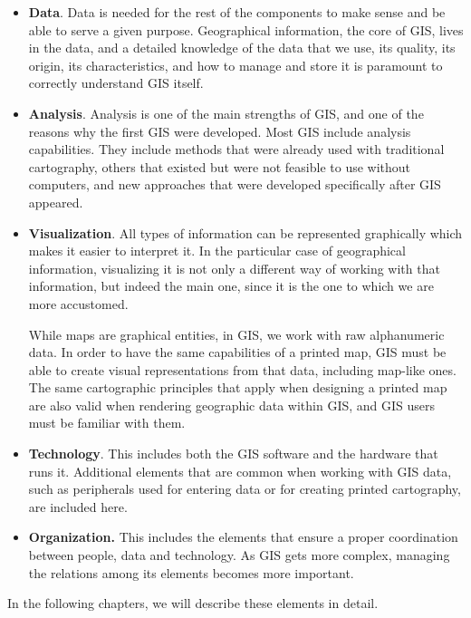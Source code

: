 \begin{itemize}
\item \textbf{Data}. Data is needed for the rest of the components to make sense and be able to serve a given purpose. Geographical information, the core of GIS, lives in the data, and a detailed knowledge of the data that we use, its quality, its origin, its characteristics, and how to manage and store it is paramount to correctly understand GIS itself.
\item \textbf{Analysis}. Analysis is one of the main strengths of GIS, and one of the reasons why the first GIS were developed. Most GIS include analysis capabilities. They include methods that were already used with traditional cartography, others that existed but were not feasible to use without computers, and new approaches that were developed specifically after GIS appeared.
\item \textbf{Visualization}. All types of information can be represented graphically which makes it easier to interpret it. In the particular case of geographical information, visualizing it is not only a different way of working with that information, but indeed the main one, since it is the one to which we are more accustomed. 

While maps are graphical entities, in GIS, we work with raw alphanumeric data. In order to have the same capabilities of a printed map, GIS must be able to create visual representations from that data, including map-like ones. The same cartographic principles that apply when designing a printed map are also valid when rendering geographic data within GIS, and GIS users must be familiar with them.
\item \textbf{Technology}. This includes both the GIS software and the hardware that runs it. Additional elements that are common when working with GIS data, such as peripherals used for entering data or for creating printed cartography, are included here.
\item \textbf{Organization.} This includes the elements that ensure a proper coordination between people, data and technology. As GIS gets more complex, managing the relations among its elements becomes more important.
\end{itemize}

In the following chapters, we will describe these elements in detail.

\pagestyle{empty}